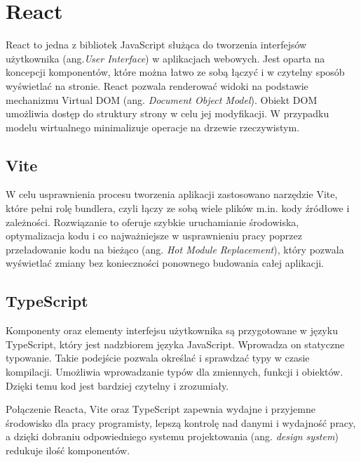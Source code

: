 \section{React}
React to jedna z bibliotek JavaScript służąca do tworzenia interfejsów użytkownika (ang.\textit{User Interface}) w aplikacjach webowych. Jest oparta na koncepcji komponentów, które można łatwo ze sobą łączyć i w czytelny sposób wyświetlać na stronie. React pozwala renderować widoki na podstawie mechanizmu Virtual DOM (ang. \textit{Document Object Model}). Obiekt DOM umożliwia dostęp do struktury strony w celu jej modyfikacji. W przypadku modelu wirtualnego minimalizuje operacje na drzewie rzeczywistym. 
\subsection*{Vite}
W celu usprawnienia procesu tworzenia aplikacji zastosowano narzędzie Vite, które pełni rolę bundlera, czyli łączy ze sobą wiele plików m.in. kody źródłowe i zależności. Rozwiązanie to oferuje szybkie uruchamianie środowiska, optymalizacja kodu i co najważniejsze w usprawnieniu pracy poprzez przeładowanie kodu na bieżąco (ang. \textit{Hot Module Replacement}), który pozwala wyświetlać zmiany bez konieczności ponownego budowania całej aplikacji. 
\subsection*{TypeScript}
Komponenty oraz elementy interfejsu użytkownika są przygotowane w języku TypeScript, który jest nadzbiorem języka JavaScript. Wprowadza on statyczne typowanie. Takie podejście pozwala określać i sprawdzać typy w czasie kompilacji. Umożliwia wprowadzanie typów dla zmiennych, funkcji i obiektów. Dzięki temu kod jest bardziej czytelny i zrozumiały. 
\newline

Połączenie Reacta, Vite oraz TypeScript zapewnia wydajne i przyjemne środowisko dla pracy programisty, lepszą kontrolę nad danymi i wydajność pracy, a dzięki dobraniu odpowiedniego systemu projektowania (ang. \textit{design system}) redukuje ilość komponentów. 

